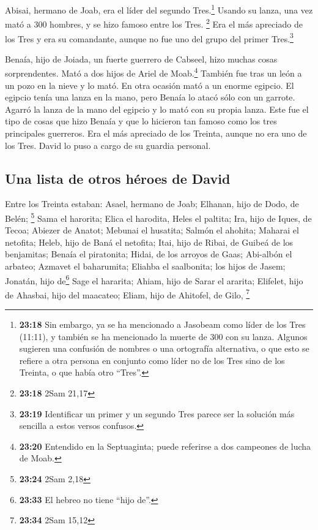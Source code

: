  Abisai, hermano de Joab, era el líder del segundo
Tres.\footnote{\textbf{23:18} Sin embargo, ya se ha mencionado a
  Jasobeam como líder de los Tres (11:11), y también se ha mencionado la
  muerte de 300 con su lanza. Algunos sugieren una confusión de nombres
  o una ortografía alternativa, o que esto se refiere a otra persona en
  conjunto como líder no de los Tres sino de los Treinta, o que había
  otro ``Tres''.} Usando su lanza, una vez mató a 300 hombres, y se hizo
famoso entre los Tres. \footnote{\textbf{23:18} 2Sam 21,17}
 Era el más apreciado de los Tres y era su comandante,
aunque no fue uno del grupo del primer Tres.\footnote{\textbf{23:19}
  Identificar un primer y un segundo Tres parece ser la solución más
  sencilla a estos versos confusos.}

 Benaía, hijo de Joiada, un fuerte guerrero de Cabseel,
hizo muchas cosas sorprendentes. Mató a dos hijos de Ariel de
Moab.\footnote{\textbf{23:20} Entendido en la Septuaginta; puede
  referirse a dos campeones de lucha de Moab.} También fue tras un león
a un pozo en la nieve y lo mató.  En otra ocasión mató a
un enorme egipcio. El egipcio tenía una lanza en la mano, pero Benaía lo
atacó sólo con un garrote. Agarró la lanza de la mano del egipcio y lo
mató con su propia lanza.  Este fue el tipo de cosas que
hizo Benaía y que lo hicieron tan famoso como los tres principales
guerreros.  Era el más apreciado de los Treinta, aunque
no era uno de los Tres. David lo puso a cargo de su guardia personal.

\hypertarget{una-lista-de-otros-huxe9roes-de-david}{%
\subsection{Una lista de otros héroes de
David}\label{una-lista-de-otros-huxe9roes-de-david}}

 Entre los Treinta estaban: Asael, hermano de Joab;
Elhanan, hijo de Dodo, de Belén; \footnote{\textbf{23:24} 2Sam 2,18}
 Sama el harorita; Elica el harodita, 
Heles el paltita; Ira, hijo de Iques, de Tecoa;  Abiezer
de Anatot; Mebunai el husatita;  Salmón el ahohita;
Maharai el netofita;  Heleb, hijo de Baná el netofita;
Itai, hijo de Ribai, de Guibeá de los benjamitas;  Benaía
el piratonita; Hidai, de los arroyos de Gaas;  Abi-albón
el arbateo; Azmavet el baharumita;  Eliahba el
saalbonita; los hijos de Jasem; Jonatán,  hijo
de\footnote{\textbf{23:33} El hebreo no tiene ``hijo de''.} Sage el
hararita; Ahiam, hijo de Sarar el ararita;  Elifelet,
hijo de Ahasbai, hijo del maacateo; Eliam, hijo de Ahitofel, de Gilo,
\footnote{\textbf{23:34} 2Sam 15,12}

